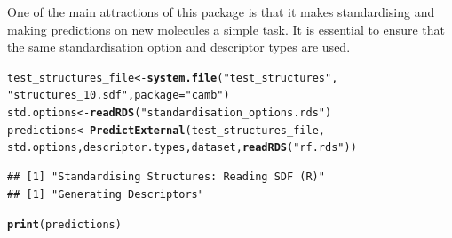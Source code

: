 \documentclass[twoside,a4wide,12pt]{article}\usepackage[]{graphicx}\usepackage[]{color}
\makeatletter
\newcommand{\hlstr}[1]{\textcolor[rgb]{0.192,0.494,0.8}{#1}}%
\newcommand{\hlstd}[1]{\textcolor[rgb]{0.345,0.345,0.345}{#1}}%
\newcommand{\hlkwb}[1]{\textcolor[rgb]{0.69,0.353,0.396}{#1}}%
\newcommand{\hlkwc}[1]{\textcolor[rgb]{0.333,0.667,0.333}{#1}}%
\newcommand{\hlkwd}[1]{\textcolor[rgb]{0.737,0.353,0.396}{\textbf{#1}}}%
\newenvironment{kframe}{%
 \def\at@end@of@kframe{}%
 \ifinner\ifhmode%
  \def\at@end@of@kframe{\end{minipage}}%
  \begin{minipage}{\columnwidth}%
 \fi\fi%
 \def\FrameCommand##1{\hskip\@totalleftmargin \hskip-\fboxsep
 \colorbox{shadecolor}{##1}\hskip-\fboxsep
     \hskip-\linewidth \hskip-\@totalleftmargin \hskip\columnwidth}%
 \MakeFramed {\advance\hsize-\width
   \@totalleftmargin\z@ \linewidth\hsize
   \@setminipage}}%
 {\par\unskip\endMakeFramed%
 \at@end@of@kframe}
\newenvironment{knitrout}{}{} %
\makeatother
\begin{document}
One of the main attractions of this package is that it makes standardising and making predictions on new molecules a simple task. It is essential to ensure that the same standardisation option and descriptor types are used.

\begin{knitrout}
\color{fgcolor}\begin{kframe}
\begin{alltt}
\hlstd{test_structures_file} \hlkwb{<-} \hlkwd{system.file}\hlstd{(}\hlstr{"test_structures"}\hlstd{,}
    \hlstr{"structures_10.sdf"}\hlstd{,} \hlkwc{package} \hlstd{=} \hlstr{"camb"}\hlstd{)}
\hlstd{std.options} \hlkwb{<-} \hlkwd{readRDS}\hlstd{(}\hlstr{"standardisation_options.rds"}\hlstd{)}
\hlstd{predictions} \hlkwb{<-} \hlkwd{PredictExternal}\hlstd{(test_structures_file,}
    \hlstd{std.options, descriptor.types, dataset,} \hlkwd{readRDS}\hlstd{(}\hlstr{"rf.rds"}\hlstd{))}
\end{alltt}
\begin{verbatim}
## [1] "Standardising Structures: Reading SDF (R)"
## [1] "Generating Descriptors"
\end{verbatim}


{\ttfamily\noindent\bfseries{}}\begin{alltt}
\hlkwd{print}\hlstd{(predictions)}
\end{alltt}


{\ttfamily\noindent\bfseries\color{errorcolor}{\#\# Error: object 'predictions' not found}}\end{kframe}
\end{knitrout}

\printbibliography
\end{document}

